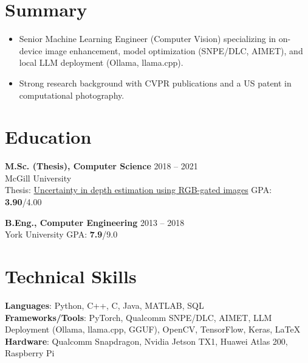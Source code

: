 \documentclass[margin, centered]{res}
\begin{document}
\begin{resume}
\vspace{-1mm}
\setlength{\parskip}{2pt}
\setlength{\parsep}{2pt}
\setlength{\itemsep}{2pt}
\section{Summary}
\begin{itemize}[leftmargin=*]
    \item Senior Machine Learning Engineer (Computer Vision) specializing in on-device image enhancement, model optimization (SNPE/DLC, AIMET), and local LLM deployment (Ollama, llama.cpp).
    \item Strong research background with CVPR publications and a US patent in computational photography.
\end{itemize}

\section{Education}

\textbf{M.Sc. (Thesis), Computer Science} \hfill 2018 -- 2021\\
McGill University \\
Thesis: \href{https://escholarship.mcgill.ca/concern/theses/fx719s021}{Uncertainty in depth estimation using RGB-gated images} \hfill GPA: \textbf{3.90}/4.00

\vspace{1mm}
\textbf{B.Eng., Computer Engineering} \hfill 2013 -- 2018\\
York University \hfill GPA: \textbf{7.9}/9.0

\section{Technical Skills}
\textbf{Languages}: Python, C++, C, Java, MATLAB, SQL \\[1.5mm]
\textbf{Frameworks/Tools}: PyTorch, Qualcomm SNPE/DLC, AIMET, LLM Deployment (Ollama, llama.cpp, GGUF), OpenCV, TensorFlow, Keras, \LaTeX \\[1.5mm]
\textbf{Hardware}: Qualcomm Snapdragon, Nvidia Jetson TX1, Huawei Atlas 200, Raspberry Pi


\end{resume}
\end{document}
